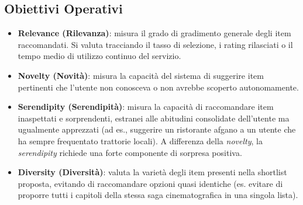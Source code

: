 \subsection{Obiettivi Operativi}
\begin{itemize}
    \item \textbf{Relevance (Rilevanza)}: misura il grado di gradimento generale degli item raccomandati. Si valuta tracciando il tasso di selezione, i rating rilasciati o il tempo medio di utilizzo continuo del servizio.
    \item \textbf{Novelty (Novità)}: misura la capacità del sistema di suggerire item pertinenti che l'utente non conosceva o non avrebbe scoperto autonomamente.
    \item \textbf{Serendipity (Serendipità)}: misura la capacità di raccomandare item inaspettati e sorprendenti, estranei alle abitudini consolidate dell'utente ma ugualmente apprezzati (ad es., suggerire un ristorante afgano a un utente che ha sempre frequentato trattorie locali). A differenza della \textit{novelty}, la \textit{serendipity} richiede una forte componente di sorpresa positiva.
    \item \textbf{Diversity (Diversità)}: valuta la varietà degli item presenti nella shortlist proposta, evitando di raccomandare opzioni quasi identiche (es. evitare di proporre tutti i capitoli della stessa saga cinematografica in una singola lista).
\end{itemize}

